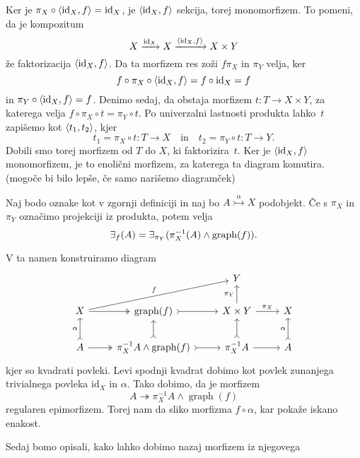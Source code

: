 \documentclass[../kategoricna_logika.tex]{subfiles}
\begin{document}
\begin{dokaz}
  Ker je $\pi_X \circ \langle \mathrm{id}_X, f \rangle = \mathrm{id}_X$, je
  $\langle \mathrm{id}_X, f \rangle$ sekcija, torej monomorfizem. To pomeni,
  da je kompozitum
  \[X \xrightarrow{\mathrm{id}_X} X \xrightarrow{\langle \mathrm{id}_X,f \rangle} X \times Y\]
  že faktorizacija $\langle \mathrm{id}_X, f \rangle$. Da
  ta morfizem res zoži $f \pi_X$ in $\pi_Y$ velja, ker
  \[ f \circ \pi_X \circ \langle \mathrm{id}_X, f \rangle = f \circ
  \mathrm{id}_X = f\]
  in $\pi_Y \circ \langle \mathrm{id}_X, f \rangle =  f$.
  Denimo sedaj, da obstaja morfizem $t : T \to X \times Y$, za
  katerega velja $f \circ \pi_X \circ t = \pi_Y \circ t$. Po
  univerzalni lastnosti produkta lahko~$t$ zapišemo kot
  $\langle t_1, t_2 \rangle$, kjer
  \[t_1 = \pi_X \circ t : T \to X \quad \text{in} \quad t_2 = \pi_Y \circ t : T \to Y. \]
  Dobili smo torej morfizem od $T$
  do $X$, ki faktorizira~$t$. Ker je $\langle \mathrm{id}_X, f \rangle$
  monomorfizem, je to enolični morfizem, za katerega ta diagram
  komutira. (mogoče bi bilo lepše, če samo narišemo diagramček)
\end{dokaz}
\begin{lema}
  Naj bodo oznake kot v zgornji definiciji in naj bo
  $A \overset{\alpha}{\rightarrowtail} X$ podobjekt. Če s $\pi_X$ in
  $\pi_Y$ označimo projekciji iz produkta, potem velja
  $$\exists_f(A) = \exists_{\pi_Y}(\pi_X^{-1}(A) \wedge \operatorname{graph}(f)).$$
\end{lema}
\begin{dokaz}
  V ta namen konstruiramo diagram
  \begin{equation*}
    \begin{tikzcd}
      & & Y & \\
      X \ar[urr, "f"] \ar[r, two heads] & \operatorname{graph}(f) \ar[r, tail] &
      X \times Y \ar[u, "\pi_Y"] \ar[r, "\pi_X"] & X \\
      A \ar[u, tail, "\alpha"] \ar[r, two heads] & \pi_X^{-1}A \land
      \operatorname{graph}(f) \ar[u, tail] \ar[r, tail] & \pi_X^{-1}A
      \ar[u, tail] \ar[r] & A \ar[u, tail, "\alpha"]
    \end{tikzcd}
  \end{equation*}
  kjer so kvadrati povleki.  Levi spodnji kvadrat dobimo kot povlek
  zunanjega trivialnega povleka $\mathrm{id}_X$ in $\alpha$.  Tako
  dobimo, da je morfizem
  $$A \twoheadrightarrow \pi_X^{-1}A \land \operatorname{graph}(f)$$
  regularen epimorfizem.  Torej nam da sliko morfizma
  $f \circ \alpha$, kar pokaže iskano enakost.
\end{dokaz}
Sedaj bomo opisali, kako lahko dobimo nazaj morfizem iz njegovega
\end{document}
